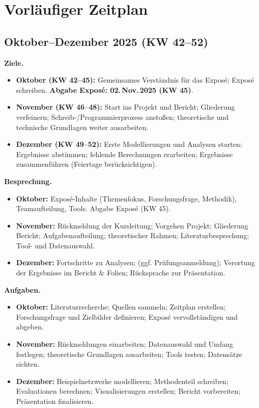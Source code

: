 \documentclass[12pt]{article} %
\begin{document}
\section{Vorläufiger Zeitplan}

\subsection*{Oktober–Dezember 2025 (KW 42–52)}

\textbf{Ziele.} 
\begin{itemize}
  \item \textbf{Oktober (KW 42–45):} Gemeinsames Verständnis für das Exposé; Exposé schreiben.  
        \textbf{Abgabe Exposé: 02.\,Nov.\,2025 (KW 45)}.
  \item \textbf{November (KW 46–48):} Start ins Projekt und Bericht; Gliederung verfeinern; 
        Schreib-/Programmierprozess anstoßen; theoretische und technische Grundlagen weiter ausarbeiten.
  \item \textbf{Dezember (KW 49–52):} Erste Modellierungen und Analysen starten; Ergebnisse abstimmen; 
        fehlende Berechnungen erarbeiten; Ergebnisse zusammenführen (Feiertage berücksichtigen).
\end{itemize}

\textbf{Besprechung.}
\begin{itemize}
  \item \textbf{Oktober:} Exposé-Inhalte (Themenfokus, Forschungsfrage, Methodik), Teamaufteilung, Tools.  
        Abgabe Exposé (KW 45).
  \item \textbf{November:} Rückmeldung der Kursleitung; Vorgehen Projekt; Gliederung Bericht; Aufgabenaufteilung; 
        theoretischer Rahmen; Literaturbesprechung; Tool- und Datenauswahl.
  \item \textbf{Dezember:} Fortschritte zu Analysen; (ggf. Prüfungsanmeldung); 
        Verortung der Ergebnisse im Bericht \& Folien; Rücksprache zur Präsentation.
\end{itemize}

\textbf{Aufgaben.}
\begin{itemize}
  \item \textbf{Oktober:} Literaturrecherche; Quellen sammeln; Zeitplan erstellen; Forschungsfrage und Zielbilder definieren; 
        Exposé vervollständigen und abgeben.
  \item \textbf{November:} Rückmeldungen einarbeiten; Datenauswahl und Umfang festlegen; theoretische Grundlagen ausarbeiten; 
        Tools testen; Datensätze sichten.
  \item \textbf{Dezember:} Beispielnetzwerke modellieren; Methodenteil schreiben; 
        Evaluationen berechnen; Visualisierungen erstellen; Bericht vorbereiten; Präsentation finalisieren.
\end{itemize}
\end{document}
